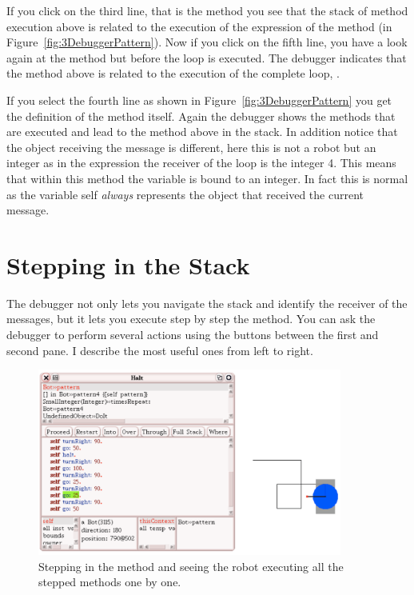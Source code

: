 If you click on the third line, that is the method  you see that the stack of method execution above is related to the execution of the expression  of the method  (in Figure~\ref{fig:3DebuggerPattern}). Now if you click on the fifth line, you have a look again at the method  but before the loop is executed. The debugger indicates that the method above is related to the execution of the complete loop, . 

If you select the fourth line as shown in Figure~\ref{fig:3DebuggerPattern} you get the definition of the method  itself. Again the debugger shows the  methods that are executed and lead to the method above in the stack. In addition notice that the object receiving the message is different, here this is not a robot but an integer as in the expression  the receiver of the loop is the integer 4. This means that within this method the variable  is bound to an integer. In fact this is normal as the variable self \emph{always} represents the object that received the current message. 

\section{Stepping in the Stack}
The \sq debugger not only lets you navigate the stack and identify the receiver of the messages, but it lets you execute step by step the method. You can ask the debugger to perform several actions using the buttons between the first and second pane. I describe the most useful ones from left to right.


\begin{figure}[h]
\centerline{\includegraphics[width=10cm]{5DebuggerSteppingOverWithRobot}}
\caption{Stepping in the method  and seeing the robot executing all the stepped methods one by one.  \label{fig:4DebuggerPattern}}
\end{figure}

